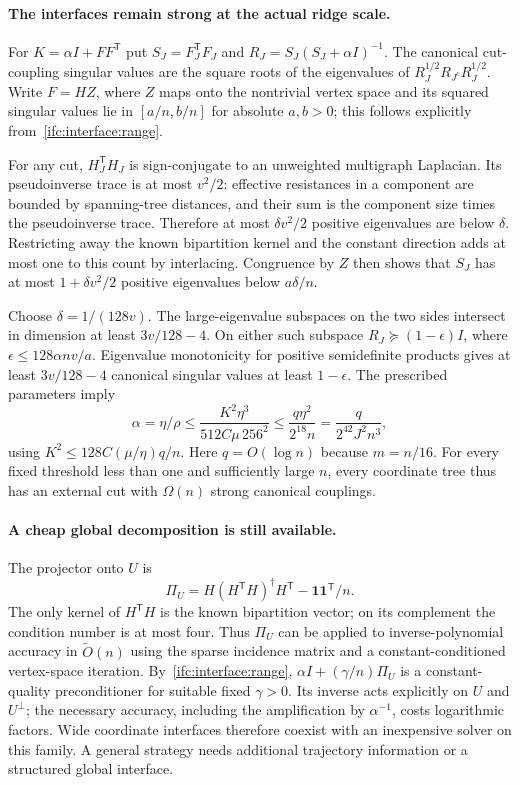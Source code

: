 \documentclass[11pt]{amsart}
\theoremstyle{definition}\newtheorem{definition}[theorem]{Definition}
\theoremstyle{remark}\newtheorem{remark}[theorem]{Remark}
\numberwithin{equation}{section}
\begin{document}
\paragraph{The interfaces remain strong at the actual ridge scale.}
For $K=\alpha I+FF^{\mathsf T}$ put
$S_J=F_J^{\mathsf T}F_J$ and $R_J=S_J(S_J+\alpha I)^{-1}$.
The canonical cut-coupling singular values are the square roots of the
eigenvalues of $R_J^{1/2}R_{J^c}R_J^{1/2}$.  Write $F=HZ$, where
$Z$ maps onto the nontrivial vertex space and its squared singular
values lie in $[a/n,b/n]$ for absolute $a,b>0$; this follows explicitly
from~\eqref{ifc:interface:range}.

For any cut, $H_J^{\mathsf T}H_J$ is sign-conjugate to an unweighted
multigraph Laplacian.  Its pseudoinverse trace is at most $v^2/2$:
effective resistances in a component are bounded by spanning-tree
distances, and their sum is the component size times the pseudoinverse
trace.  Therefore at most $\delta v^2/2$ positive eigenvalues are below
$\delta$.  Restricting away the known bipartition kernel and the
constant direction adds at most one to this count by interlacing.
Congruence by $Z$ then shows that $S_J$ has at most
$1+\delta v^2/2$ positive eigenvalues below $a\delta/n$.

Choose $\delta=1/(128v)$.  The large-eigenvalue subspaces on the two
sides intersect in dimension at least $3v/128-4$.
On either such subspace $R_J\succeq(1-\epsilon)I$, where
$\epsilon\le128\alpha nv/a$.  Eigenvalue monotonicity for positive
semidefinite products gives at least $3v/128-4$ canonical singular
values at least $1-\epsilon$.
The prescribed parameters imply
\[
 \alpha=\eta/\rho
 \le\frac{K^2\eta^3}{512C\mu\,256^2}
 \le\frac{q\eta^2}{2^{18}n}
 =\frac{q}{2^{42}J^2n^3},
\]
using $K^2\le128C(\mu/\eta)q/n$.
Here $q=O(\log n)$ because $m=n/16$.
For every fixed threshold less than one and sufficiently large $n$,
every coordinate tree thus has an external cut with $\Omega(n)$ strong
canonical couplings.

\paragraph{A cheap global decomposition is still available.}
The projector onto $U$ is
\[
 \Pi_U=H(H^{\mathsf T}H)^\dagger H^{\mathsf T}
                         -\mathbf1\mathbf1^{\mathsf T}/n.
\]
The only kernel of $H^{\mathsf T}H$ is the known bipartition vector;
on its complement the condition number is at most four.
Thus $\Pi_U$ can be applied to inverse-polynomial accuracy in
$\widetilde O(n)$ using the sparse incidence matrix and a
constant-conditioned vertex-space iteration.
By~\eqref{ifc:interface:range}, $\alpha I+(\gamma/n)\Pi_U$ is a
constant-quality preconditioner for suitable fixed $\gamma>0$.
Its inverse acts explicitly on $U$ and $U^\perp$; the necessary
accuracy, including the amplification by $\alpha^{-1}$, costs
logarithmic factors.  Wide coordinate interfaces therefore coexist
with an inexpensive solver on this family.  A general strategy needs
additional trajectory information or a structured global interface.
\end{document}

